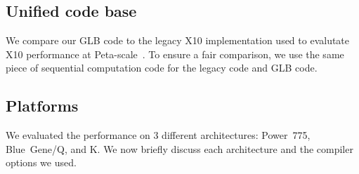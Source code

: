 \subsection{Unified code base}
We compare our GLB code to the legacy X10 implementation used to
evalutate X10 performance at Peta-scale~\cite{tardieu-petascale}. To
ensure a fair comparison, we use the same piece of sequential computation code for the legacy code and GLB code. 
\subsection{Platforms}
We evaluated the performance on 3 different architectures: Power~775,
Blue~Gene/Q, and K. We now briefly discuss each architecture and the compiler options we used.







